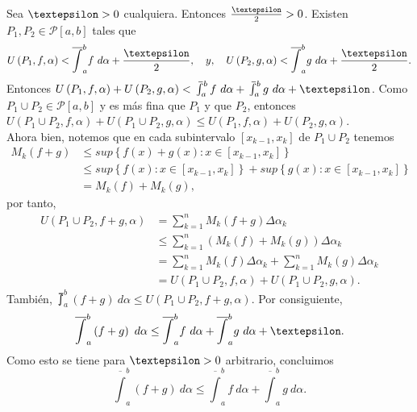 Sea $\text{\textepsilon}>0$ cualquiera. Entonces $\frac{\text{\textepsilon}}{2}>0$. Existen $P_1,P_2\in\mathcal{P}\left[a,b\right]$ tales que
  \begin{equation*}
    U\left(P_1,f,\alpha\right) < \overline{\int}_a^b f\ d\alpha + \frac{\textepsilon}{2},\quad y,\quad U\left(P_2,g,\alpha\right) < \overline{\int}_a^b g\ d\alpha + \frac{\textepsilon}{2}.
  \end{equation*}
  Entonces $U\left(P_1,f,\alpha\right)+U\left(P_2,g,\alpha\right)<\upint_a^b f\ d\alpha + \upint_a^b g\ d\alpha + \text{\textepsilon}$. Como $P_1\cup P_2 \in \mathcal{P}\left[a,b\right]$ y es más fina que $P_1$ y que $P_2$, entonces $U\left(P_1\cup P_2,f,\alpha\right)+U\left(P_1\cup P_2,g,\alpha\right) \leq U\left(P_1,f,\alpha\right)+U\left(P_2,g,\alpha\right)$.\\
  Ahora bien, notemos que en cada subintervalo $\left[x_{k-1},x_k\right]$ de $P_1\cup P_2$ tenemos
  \begin{align*}
    M_k\left(f+g\right)&\leq sup\left\lbrace f\left(x\right)+g\left(x\right): x\in\left[x_{k-1},x_k\right]\right\rbrace\\
    &\leq sup\left\lbrace f\left(x\right): x\in\left[x_{k-1},x_k\right]\right\rbrace+sup\left\lbrace g\left(x\right): x\in\left[x_{k-1},x_k\right]\right\rbrace\\
    &=M_k\left(f\right)+M_k\left(g\right),
  \end{align*}
por tanto,
\begin{align*}
  U\left(P_1\cup P_2, f+g, \alpha\right)&= \sum_{k=1}^{n} M_k\left(f+g\right)\Delta\alpha_k\\
  &\leq\sum_{k=1}^{n} \left(M_k\left(f\right)+M_k\left(g\right)\right)\Delta\alpha_k\\
  &=\sum_{k=1}^{n} M_k\left(f\right)\Delta\alpha_k+\sum_{k=1}^{n} M_k\left(g\right)\Delta\alpha_k\\
  &=U\left(P_1\cup P_2, f, \alpha\right)+U\left(P_1\cup P_2, g, \alpha\right).
\end{align*}
También, $\upint_a^b\left(f+g\right)\ d\alpha \leq U\left(P_1\cup P_2, f+g, \alpha\right)$. Por consiguiente,
\begin{equation*}
\overline{\int}_a^b \left(f+g\right)\ d\alpha \leq \overline{\int}_a^b f\ d\alpha + \overline{\int}_a^b g\ d\alpha +  \text{\textepsilon}.
\end{equation*}
Como esto se tiene para $\text{\textepsilon}>0$ arbitrario, concluimos
\begin{equation*}
\overline{\int}_a^b \left(f+g\right)\ d\alpha \leq \overline{\int}_a^b f\ d\alpha + \overline{\int}_a^b g\ d\alpha .
\end{equation*}

